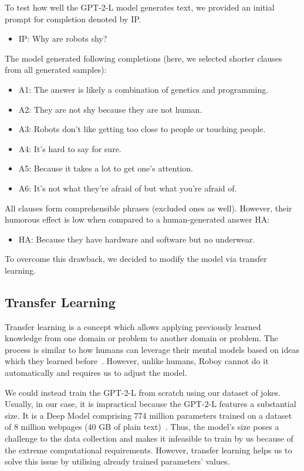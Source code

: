 To test how well the GPT-2-L model generates text, we provided an initial prompt for completion denoted by IP. 
\begin{itemize}
    \item IP:    Why are robots shy? 
\end{itemize}

The model generated following completions (here, we selected shorter clauses from all generated samples):
\begin{itemize}
    \item A1:    The answer is likely a combination of genetics and programming. 
    \item A2:    They are not shy because they are not human.
    \item A3:    Robots don't like getting too close to people or touching people.
    \item A4:    It's hard to say for sure.
    \item A5:    Because it takes a lot to get one's attention.
    \item A6:    It's not what they're afraid of but what you're afraid of.
\end{itemize}

All clauses form comprehensible phrases (excluded ones as well). However, their humorous effect is low when compared to a human-generated answer HA:
\begin{itemize}
    \item HA:    Because they have hardware and software but no underwear.
\end{itemize}    

To overcome this drawback, we decided to modify the model via transfer learning.

\subsection{Transfer Learning}
Transfer learning is a concept which allows applying previously learned knowledge from one domain or problem to another domain or problem. The process is similar to how humans can leverage their mental models based on ideas which they learned before~\parencite{transferlearn}. However, unlike humans, Roboy cannot do it automatically and requires us to adjust the model.

We could instead train the GPT-2-L from scratch using our dataset of jokes. Usually, in our case, it is impractical because the GPT-2-L features a substantial size. It is a Deep Model comprising 774 million parameters trained on a dataset of 8 million webpages (40 GB of plain text)~\parencite{radford2019language}. Thus, the model’s size poses a challenge to the data collection and makes it infeasible to train by us because of the extreme computational requirements. However, transfer learning helps us to solve this issue by utilising already trained parameters’ values.

